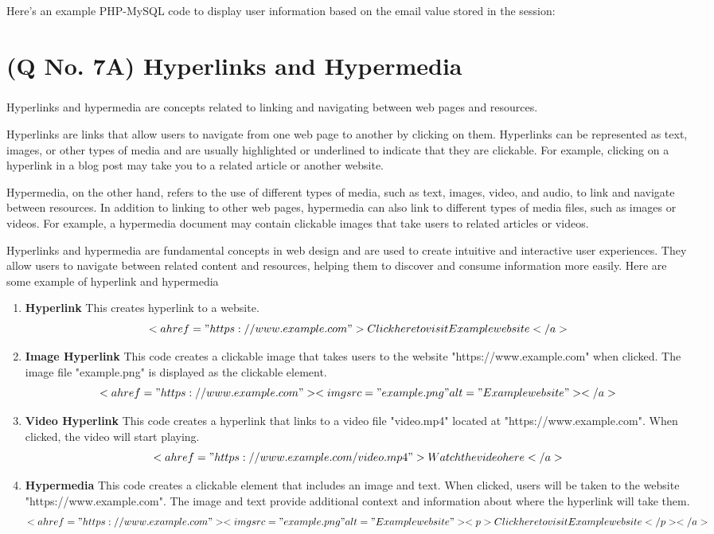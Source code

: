 \documentclass[11pt]{article}
\begin{document}
Here's an example PHP-MySQL code to display user information based on the email value stored in the session:


\section{(Q No. 7A) Hyperlinks and Hypermedia}
\subparagraph{}
Hyperlinks and hypermedia are concepts related to linking and navigating between web pages and resources.

Hyperlinks are links that allow users to navigate from one web page to another by clicking on them. Hyperlinks can be represented as text, images, or other types of media and are usually highlighted or underlined to indicate that they are clickable. For example, clicking on a hyperlink in a blog post may take you to a related article or another website.

Hypermedia, on the other hand, refers to the use of different types of media, such as text, images, video, and audio, to link and navigate between resources. In addition to linking to other web pages, hypermedia can also link to different types of media files, such as images or videos. For example, a hypermedia document may contain clickable images that take users to related articles or videos.

Hyperlinks and hypermedia are fundamental concepts in web design and are used to create intuitive and interactive user experiences. They allow users to navigate between related content and resources, helping them to discover and consume information more easily.
Here are some example of hyperlink and hypermedia
\begin{enumerate}
    \item \textbf{Hyperlink} This creates hyperlink to a website.
    \[ <a href="https://www.example.com">Click here to visit Example website</a>
\] 
    \item \textbf{Image Hyperlink} This code creates a clickable image that takes users to the website "https://www.example.com" when clicked. The image file "example.png" is displayed as the clickable element.
    \[ <a href="https://www.example.com"><img src="example.png" alt="Example website"></a>
\]
    \item \textbf{Video Hyperlink} This code creates a hyperlink that links to a video file "video.mp4" located at "https://www.example.com". When clicked, the video will start playing.
     \[ <a href="https://www.example.com/video.mp4">Watch the video here</a>
\]
    \item \textbf{Hypermedia} This code creates a clickable element that includes an image and text. When clicked, users will be taken to the website "https://www.example.com". The image and text provide additional context and information about where the hyperlink will take them.
    \[ <a href="https://www.example.com">
    <img src="example.png" alt="Example website">
    <p>Click here to visit Example website</p>
  </a>
\]  
\end{enumerate}
\end{document}
